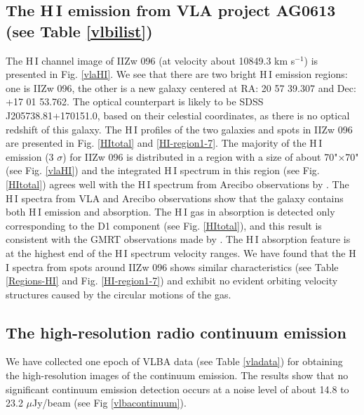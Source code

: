 \documentclass[]{aa} %
\newcommand{\kms}{km s$^{-1}$\xspace}
\newcommand{\HI}{{\rm H\,{\scriptsize I}}\xspace}
\begin{document}
\subsection{The \HI emission from VLA project AG0613 (see Table \ref{vlbilist})}
The \HI channel image of IIZw 096 (at velocity about 10849.3 \kms) is presented in Fig. \ref{vlaHI}. We see that there are two bright \HI emission regions: one is IIZw 096, the other is a new galaxy centered at RA: 20 57 39.307 and Dec: +17 01 53.762. The optical counterpart is likely to be SDSS J205738.81+170151.0, based on their celestial coordinates, as there is no optical redshift of this galaxy. The \HI profiles of the two galaxies and spots in IIZw 096 are presented in Fig. \ref{HItotal} and \ref{HI-region1-7}. The majority of the \HI emission (3 $\sigma$) for IIZw 096 is distributed in a region with a size of about 70"$\times$70" (see Fig. \ref{vlaHI}) and the integrated \HI spectrum in this region (see Fig. \ref{HItotal}) agrees well with the \HI spectrum from Arecibo observations by \cite{2015MNRAS.447.1531C}. The \HI spectra from VLA and Arecibo observations show that the galaxy contains both \HI emission and absorption. The \HI gas in absorption is detected only corresponding to the D1 component (see Fig. \ref{HItotal}), and this result is consistent with the GMRT observations made by \cite{2019MNRAS.489.1099D}.  The \HI absorption feature is at the highest end of the \HI spectrum velocity ranges. We have found that the \HI spectra from spots around IIZw 096 shows similar characteristics (see Table \ref{Regions-HI} and Fig. \ref{HI-region1-7}) and exhibit no evident orbiting velocity structures caused by the circular motions of the gas.


\subsection{The high-resolution radio continuum emission}
  We have collected one epoch of VLBA data (see Table \ref{vladata}) for obtaining the high-resolution images of the continuum emission. The results show that no significant continuum emission detection occurs at a noise level of about 14.8 to 23.2 $\mu$Jy/beam (see Fig \ref{vlbacontinuum}).
\end{document}
